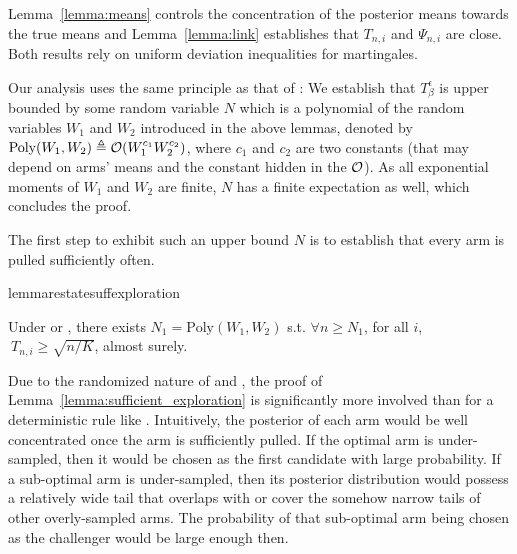 Lemma~\ref{lemma:means} controls the concentration of the posterior means towards the true means and Lemma~\ref{lemma:link} establishes that $T_{n,i}$ and $\Psi_{n,i}$ are close. Both results rely on uniform deviation inequalities for martingales.


Our analysis uses the same principle as that of \TTEI: We establish that $T_\beta^\epsilon$ is upper bounded by some random variable $N$ which is a polynomial of the random variables $W_1$ and $W_2$ introduced in the above lemmas, denoted by $\text{Poly}(W_1,W_2) \triangleq \mathcal{O}(W_1^{c_1}W_2^{c_2})$, where $c_1$ and $c_2$ are two constants (that may depend on arms' means and the constant hidden in the $\mathcal{O}$). As all exponential moments of $W_1$ and $W_2$ are finite, $N$ has a finite expectation as well, which concludes the proof.

The first step to exhibit such an upper bound $N$ is to establish that every arm is pulled sufficiently often. 

\begin{restatable}{lemma}{restatesuffexploration}\label{lemma:sufficient_exploration}
\begin{leftbar}[lemmabar]
    Under \TTTS or \TCC, there exists $N_1 = \text{Poly}(W_1,W_2)$ s.t. $\forall n \geq N_1$, for all $i$, $\ T_{n,i} \geq \sqrt{{n}/{K}}$, almost surely.
\end{leftbar}
\end{restatable}

Due to the randomized nature of \TTTS and \TCC, the proof of Lemma~\ref{lemma:sufficient_exploration} is significantly more involved than for a deterministic rule like \TTEI. Intuitively, the posterior of each arm would be well concentrated once the arm is sufficiently pulled. If the optimal arm is under-sampled, then it would be chosen as the first candidate with large probability. If a sub-optimal arm is under-sampled, then its posterior distribution would possess a relatively wide tail that overlaps with or cover the somehow narrow tails of other overly-sampled arms. The probability of that sub-optimal arm being chosen as the challenger would be large enough then.

